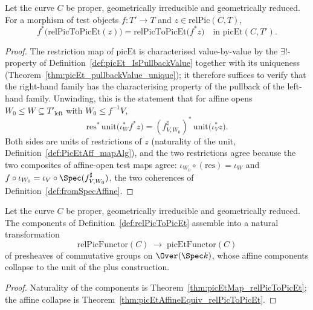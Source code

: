 \begin{theorem}
  \label{thm:picEtMap_relPicToPicEt}
  \leanok
  Let the curve \(C\) be proper, geometrically irreducible and geometrically reduced. For a
  morphism of test objects \(f \colon T' \to T\) and \(z \in \mathrm{relPic}(C,T)\),
  \[
    f^{*}\bigl(\mathrm{relPicToPicEt}(z)\bigr)
      = \mathrm{relPicToPicEt}\bigl(f^{*} z\bigr)
    \quad\text{in } \mathrm{picEt}(C,T').
  \]
\end{theorem}
\begin{proof}
  \leanok
  The restriction map of \(\mathrm{picEt}\) is characterised value-by-value by the
  \(\exists!\)-property of Definition~\ref{def:picEt_IsPullbackValue} together with its
  uniqueness (Theorem~\ref{thm:picEt_pullbackValue_unique}); it therefore suffices to verify
  that the right-hand family has the characterising property of the pullback of the
  left-hand family. Unwinding, this is the statement that for affine opens
  \(W_0 \le W \subseteq T'_{\mathrm{left}}\) with \(W_0 \le f^{-1}V\),
  \[
    \mathrm{res}^{*}\,\mathrm{unit}\bigl(\iota_W^{*} f^{*} z\bigr)
      = (f^{\sharp}_{V,W_0})^{*}\,\mathrm{unit}\bigl(\iota_V^{*} z\bigr).
  \]
  Both sides are units of restrictions of \(z\) (naturality of the unit,
  Definition~\ref{def:PicEtAff_mapAlg}), and the two restrictions agree because the two
  composites of affine-open test maps agree: \(\iota_{W_0} \circ (\text{res}) = \iota_W\) and
  \(f \circ \iota_{W_0} = \iota_V \circ \Spec(f^{\sharp}_{V,W_0})\), the two coherences of
  Definition~\ref{def:fromSpecAffine}.
\end{proof}

\begin{definition}
  \label{def:picEtUnit}
  \leanok
  Let the curve \(C\) be proper, geometrically irreducible and geometrically reduced. The
  components of Definition~\ref{def:relPicToPicEt} assemble into a natural transformation
  \[
    \mathrm{relPicFunctor}(C) \;\longrightarrow\; \mathrm{picEtFunctor}(C)
  \]
  of presheaves of commutative groups on \(\Over(\Spec k)\), whose affine components collapse
  to the unit of the plus construction.
\end{definition}
\begin{proof}
  \leanok
  Naturality of the components is Theorem~\ref{thm:picEtMap_relPicToPicEt}; the affine
  collapse is Theorem~\ref{thm:picEtAffineEquiv_relPicToPicEt}.
\end{proof}

